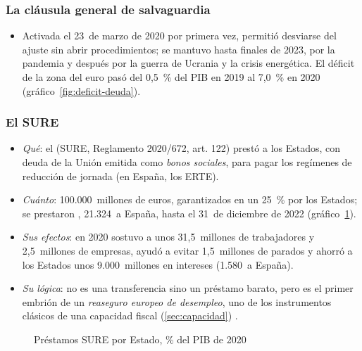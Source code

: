 \documentclass[11pt]{article}
\begin{document}
\subsubsection{La cláusula general de salvaguardia}\label{sec:clausula}

\begin{itemize}
\item Activada el 23~de marzo de 2020 por primera vez, permitió desviarse del ajuste sin abrir procedimientos; se mantuvo hasta finales de 2023, por la pandemia y después por la guerra de Ucrania y la crisis energética. El déficit de la zona del euro pasó del 0,5~\% del PIB en 2019 al 7,0~\% en 2020 (gráfico~\ref{fig:deficit-deuda}).
\end{itemize}

\subsubsection{El SURE}\label{sec:sure}

\begin{itemize}
\item \emph{Qué}: el  (SURE, Reglamento 2020/672, art. 122) prestó a los Estados, con deuda de la Unión emitida como \emph{bonos sociales}, para pagar los regímenes de reducción de jornada (en España, los ERTE)\nocite{UE2020SURE}.
\item \emph{Cuánto}: 100.000~millones de euros, garantizados en un 25~\% por los Estados; se prestaron , 21.324~a España, hasta el 31~de diciembre de 2022 (gráfico~\ref{fig:sure})\nocite{CE2026SUREpaises}.
\item \emph{Sus efectos}: en 2020 sostuvo a unos 31,5~millones de trabajadores y 2,5~millones de empresas, ayudó a evitar 1,5~millones de parados y ahorró a los Estados unos 9.000~millones en intereses (1.580~a España)\nocite{CE2023SUREfinal,CE2026SURE}.
\item \emph{Su lógica}: no es una transferencia sino un préstamo barato, pero es el primer embrión de un \emph{reaseguro europeo de desempleo}, uno de los instrumentos clásicos de una capacidad fiscal (\ref{sec:capacidad}) .
\end{itemize}

\begin{figure}[H]
\centering
\caption{Préstamos SURE por Estado, \% del PIB de 2020}\label{fig:sure}
\end{figure}
\end{document}
